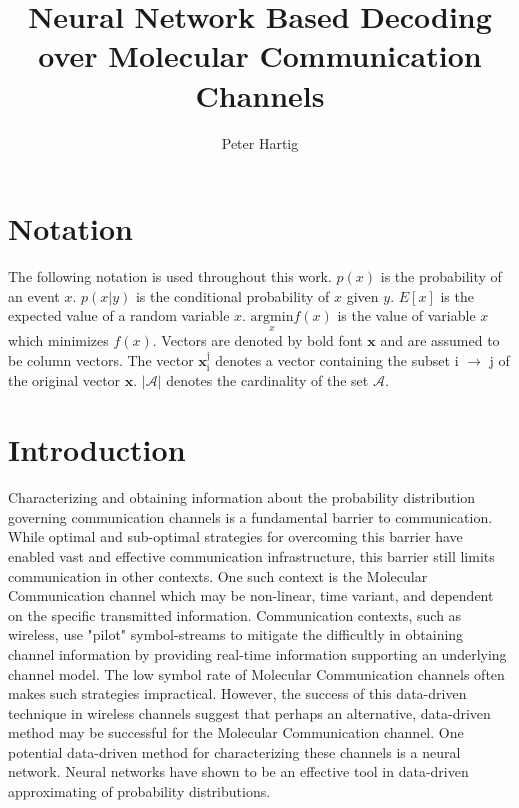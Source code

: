 \documentclass[12pt,a4paper]{report}
\title{Neural Network Based Decoding over Molecular Communication Channels}
\author{Peter Hartig}
\begin{document}
\maketitle

\begin{abstract}

\end{abstract}

\newpage
\tableofcontents
\newpage
\section{Notation}
The following notation is used throughout this work.
$p(x)$ is the probability of an event $x$.
$p(x|y)$ is the conditional probability of $x$ given $y$.
$E[x]$ is the expected value of a random variable $x$.
$\underset{x}{\text{argmin}} f(x)$ is the value of variable $x$ which minimizes $f(x)$.
Vectors  are denoted by bold font $\mathbf{x}$ and are assumed to be column vectors.
The vector $\mathbf{x}_{\mathrm{i}}^{\mathrm{j}}$ denotes a vector containing the subset i $\rightarrow$ j of the original vector $\mathbf{x}$. $|\mathcal{A}|$ denotes the cardinality of the set $\mathcal{A}$.

\section{Introduction}
Characterizing and obtaining information about the probability distribution governing communication channels is a fundamental barrier to communication. While optimal and sub-optimal strategies for overcoming this barrier have enabled vast and effective communication infrastructure, this barrier still limits communication in other contexts. One such context is the Molecular Communication channel which may be non-linear, time variant, and dependent on the specific transmitted information.
Communication contexts, such as wireless, use "pilot" symbol-streams to mitigate the difficultly in obtaining channel information by providing real-time information supporting an underlying channel model. The low symbol rate of Molecular Communication channels often makes such strategies impractical. However, the success of this data-driven technique in wireless channels suggest that perhaps an alternative, data-driven method may be successful for the Molecular Communication channel. One potential data-driven method for characterizing these channels is a neural network. Neural networks have shown to be an effective tool in data-driven approximating of probability distributions.
\par
\end{document}
